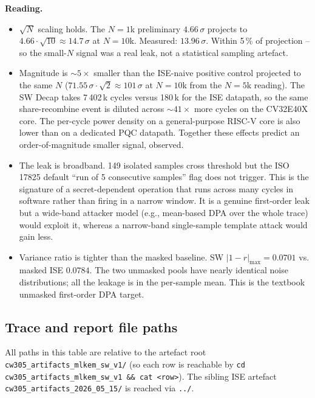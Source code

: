 \documentclass[11pt]{article}
\begin{document}
\textbf{Reading.}
\begin{itemize}
\item $\sqrt{N}$ scaling holds. The $N{=}1$k preliminary $4.66\,\sigma$ projects
to $4.66 \cdot \sqrt{10} \approx 14.7\,\sigma$ at $N{=}10$k. Measured: $13.96\,\sigma$.
Within 5\,\% of projection -- so the small-$N$ signal was a real leak, not
a statistical sampling artefact.
\item Magnitude is $\sim 5\times$ smaller than the ISE-naive positive control
projected to the same $N$ ($71.55\,\sigma \cdot \sqrt{2} \approx 101\,\sigma$
at $N{=}10$k from the $N{=}5$k reading). The SW Decap takes 7\,402\,k cycles
versus 180\,k for the ISE datapath, so the same share-recombine event is
diluted across $\sim 41\times$ more cycles on the CV32E40X core. The
per-cycle power density on a general-purpose RISC-V core is also lower than
on a dedicated PQC datapath. Together these effects predict an
order-of-magnitude smaller signal, observed.
\item The leak is broadband. 149 isolated samples cross threshold but the
ISO 17825 default ``run of 5 consecutive samples'' flag does not trigger.
This is the signature of a secret-dependent operation that runs across
many cycles in software rather than firing in a narrow window. It is a
genuine first-order leak but a wide-band attacker model (e.g.,
mean-based DPA over the whole trace) would exploit it, whereas a
narrow-band single-sample template attack would gain less.
\item Variance ratio is tighter than the masked baseline. SW $|1-r|_{\max} =
0.0701$ vs. masked ISE $0.0784$. The two unmasked pools have nearly
identical noise distributions; all the leakage is in the per-sample mean.
This is the textbook unmasked first-order DPA target.
\end{itemize}

\subsection{Trace and report file paths}

All paths in this table are relative to the artefact root \texttt{cw305\_artifacts\_mlkem\_sw\_v1/} (so each row is reachable by \texttt{cd cw305\_artifacts\_mlkem\_sw\_v1 \&\& cat <row>}). The sibling ISE artefact \texttt{cw305\_artifacts\_2026\_05\_15/} is reached via \texttt{../}.
\end{document}

